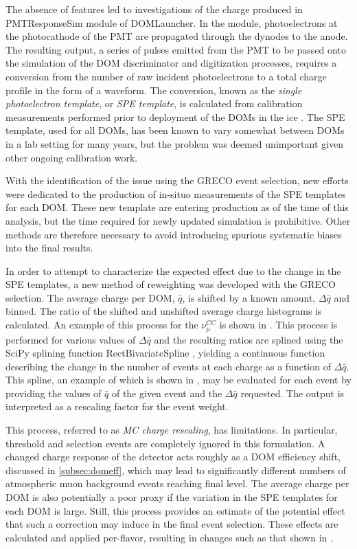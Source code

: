 The absence of features led to investigations of the charge produced in PMTResponseSim module of DOMLauncher.
In the module, photoelectrons at the photocathode of the PMT are propagated through the dynodes to the anode.
The resulting output, a series of pulses emitted from the PMT to be passed onto the simulation of the DOM discriminator and digitization processes, requires a conversion from the number of raw incident photoelectrons to a total charge profile in the form of a waveform.
The conversion, known as the \emph{single photoelectron template}, or \emph{SPE template}, is calculated from calibration measurements performed prior to deployment of the DOMs in the ice .
The SPE template, used for all DOMs, has been known to vary somewhat between DOMs in a lab setting for many years, but the problem was deemed unimportant given other ongoing calibration work.

With the identification of the issue using the GRECO event selection, new efforts were dedicated to the production of in-situo measurements of the SPE templates for each DOM.
These new template are entering production as of the time of this analysis, but the time required for newly updated simulation is prohibitive.
Other methods are therefore necessary to avoid introducing spurious systematic biases into the final results.

In order to attempt to characterize the expected effect due to the change in the SPE templates, a new method of reweighting was developed with the GRECO selection.
The average charge per DOM, ${\bar{q}}$, is shifted by a known amount, ${\Delta \bar{q}}$ and binned.
The ratio of the shifted and unshifted average charge histograms is calculated.
An example of this process for the ${\nu_\mu^{CC}}$ is shown in .
This process is performed for various values of ${\Delta \bar{q}}$ and the resulting ratios are splined using the SciPy splining function RectBivariateSpline , yielding a continuous function describing the change in the number of events at each charge as a function of ${\Delta \bar{q}}$.
This spline, an example of which is shown in , may be evaluated for each event by providing the values of ${\bar{q}}$ of the given event and the ${\Delta \bar{q}}$ requested.
The output is interpreted as a rescaling factor for the event weight.

This process, referred to as \emph{MC charge rescaling}, has limitations.
In particular, threshold and selection events are completely ignored in this formulation.
A changed charge response of the detector acts roughly as a DOM efficiency shift, discussed in \ref{subsec:domeff}, which may lead to significantly different numbers of atmospheric muon background events reaching final level.
The average charge per DOM is also potentially a poor proxy if the variation in the SPE templates for each DOM is large.
Still, this process provides an estimate of the potential effect that such a correction may induce in the final event selection.
These effects are calculated and applied per-flavor, resulting in changes such as that shown in .

